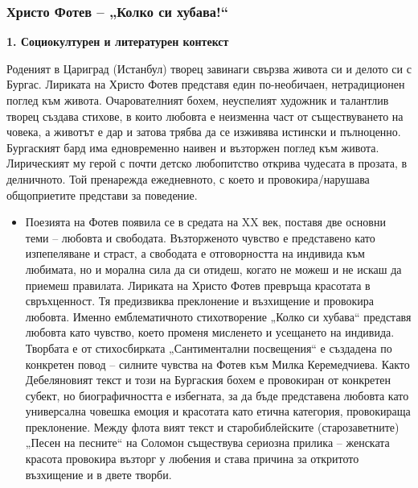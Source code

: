 \documentclass[12pt,a4paper]{article}
\begin{document}
\subsubsection{\colorbox{green!40}{Христо Фотев – „Колко си хубава!“}}

\textbf{1. Социокултурен и литературен контекст}
\vspace{0.1cm}
 
\indent Роденият в Цариград (Истанбул) творец завинаги свързва живота си и делото си с Бургас. Лириката на Христо Фотев представя един по-необичаен, нетрадиционен поглед към живота. Очарователният бохем, неуспелият художник и талантлив творец създава стихове, в които любовта е неизменна част от съществуването на човека, а животът е дар и затова трябва да се изживява истински и пълноценно. Бургаският бард има едновременно наивен и възторжен поглед към живота. Лирическият му герой с почти детско любопитство открива чудесата в прозата, в делничното. Той пренарежда ежедневното, с което и провокира/нарушава общоприетите представи за поведение.

\begin{itemize}[leftmargin=*]
\vspace{-0.2cm}
\item Поезията на Фотев появила се в средата на XX век, поставя две основни теми – любовта и свободата.  Възторженото чувство е представено като изпепеляване и страст, а свободата е отговорността на индивида към любимата, но и морална сила да си отидеш, когато не можеш и не искаш да приемеш правилата. Лириката на Христо Фотев превръща красотата в свръхценност. Тя предизвиква преклонение и възхищение и провокира любовта. Именно емблематичното стихотворение „Колко си хубава“ представя любовта като чувство, което променя мисленето и усещането на индивида. Творбата е от стихосбирката „Сантиментални посвещения“ е създадена по конкретен повод – силните чувства на Фотев към Милка Керемедчиева. Както Дебеляновият текст и този на Бургаския бохем е провокиран от конкретен субект, но биографичността е избегната, за да бъде представена любовта като универсална човешка емоция и красотата като етична категория, провокираща преклонение. Между флота вият текст и старобиблейските (старозаветните) „Песен на песните“ на Соломон съществува сериозна прилика – женската красота провокира възторг у любения и става причина за откритото възхищение и в двете творби.
\end{itemize}

\vspace{0.1cm}
 
\end{document}
